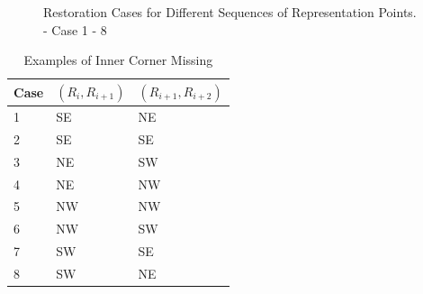 \begin{figure}[htbp]
	 
	\caption{Restoration Cases for Different Sequences of Representation Points. \protect{} - \protect{} Case 1 - 8}
	\label{fig:image13}
\end{figure}

 \begin{table}[h]
	\centering
	\begin{tabularx}{0.7\textwidth}{Y|Y|Y}
		\hline
		Case & $(R_i, R_{i+1})$ & $(R_{i+1}, R_{i+2})$\\
		 & SE & NE \\
		2 & SE & SE \\
		3 & NE & SW \\
		4 & NE & NW \\
		5 & NW & NW \\
		6 & NW & SW \\
		7 & SW & SE \\
		8 & SW & NE \\
		\hline
	\end{tabularx}
	\caption{Examples of Inner Corner Missing}
	\label{table:ex_innerCornerMissing}
\end{table}


